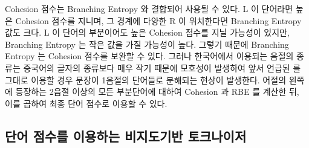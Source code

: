 \documentclass[oneside, ko,phd]{snuthesis_utf8_kor}
\begin{document}
\begin{table}[ht]
\centering
\caption{Cohesion 점수와 Branching Entropy 예시}
\label{tab:cohesion_demo}
\end{table}

Cohesion 점수는 Branching Entropy 와 결합되어 사용될 수 있다.
L 이 단어라면 높은 Cohesion 점수를 지니며, 그 경계에 다양한 R 이 위치한다면 Branching Entropy 값도 크다.
L 이 단어의 부분이어도 높은 Cohesion 점수를 지닐 가능성이 있지만, Branching Entropy 는 작은 값을 가질 가능성이 높다.
그렇기 때문에 Branching Entropy 는 Cohesion 점수를 보완할 수 있다.
그러나 한국어에서 이용되는 음절의 종류는 중국어의 글자의 종류보다 매우 작기 때문에 모호성이 발생하여 앞서 언급된 \cite{zhao2008exploiting, feng2004unsupervised} 를 그대로 이용할 경우 문장이 1음절의 단어들로 분해되는 현상이 발생한다.
어절의 왼쪽에 등장하는 2음절 이상의 모든 부분단어에 대하여 Cohesion 과 RBE 를 계산한 뒤, 이를 곱하여 최종 단어 점수로 이용할 수 있다.

\subsection{단어 점수를 이용하는 비지도기반 토크나이저}
\end{document}
